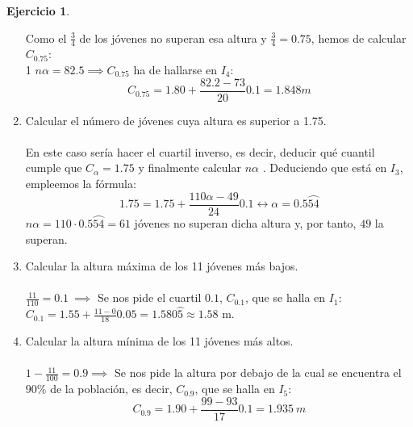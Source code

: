 \documentclass[a4paper, 12pt]{article}
\theoremstyle{definition}
\newtheorem{ej}{Ejercicio}
\begin{document}
\begin{ej}
\begin{enumerate}[label=\textit{\alph*)}]
    Como el $\frac{3}{4}$ de los jóvenes no superan esa altura y $\frac{3}{4}=0.75$, hemos de calcular $C_{0.75}$:
    \\
    1 $n\alpha = 82.5 \implies C_{0.75}$ ha de hallarse en $I_{4}$:
    $$C_{0.75} = 1.80 + \frac{82.2 - 73}{20}0.1 = 1.848m$$
    \item Calcular el número de jóvenes cuya altura es superior a 1.75. \\\\
    En este caso sería hacer el cuartil inverso, es decir, deducir qué cuantil cumple que $C_{\alpha} = 1.75$ y finalmente calcular $n\alpha$ . Deduciendo que está en $I_{3}$, empleemos la fórmula:
    $$1.75 = 1.75 + \frac{110\alpha - 49}{24}0.1 \longleftrightarrow \alpha = 0.5\wideparen{54}$$
    $n\alpha = 110 \cdot 0.5\wideparen{54} = 61$ jóvenes no superan dicha altura y, por tanto, $49$ la superan. \\
    \item Calcular la altura máxima de los 11 jóvenes más bajos.\\\\
    $\frac{11}{110} = 0.1 \ \implies$ Se nos pide el cuartil $0.1$, $C_{0.1}$, que se halla en $I_{1}$: \\
    $C_{0.1} = 1.55 + \frac{11-0}{18}0.05 = 1.580\wideparen{5} \approx 1.58$ m. \\
    \item Calcular la altura mínima de los 11 jóvenes más altos.
    \\\\
    $1-\frac{11}{100}=0.9 \implies$ Se nos pide la altura por debajo de la cual se encuentra el $90\%$ de la población, es decir, $C_{0.9}$, que se halla en $I_{5}$: \\
    $$C_{0.9} = 1.90 + \frac{99-93}{17}0.1 = 1.935 \ m$$
\end{enumerate}
\end{ej}

\newpage
\end{document}
